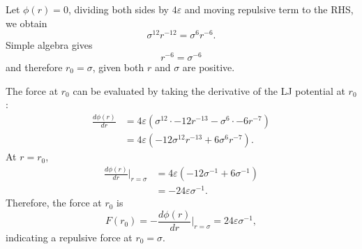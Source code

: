 \documentclass[a4paper,10pt,twocolumn]{article}
\begin{document}
Let $\phi(r)=0$, dividing both sides by $4\varepsilon$ and moving repulsive term to the RHS, we obtain
\[
\sigma^{12}{r}^{-12}=\sigma^{6}{r}^{-6}.
\]
Simple algebra gives
\[
r^{-6}=\sigma^{-6}
\]
and therefore $r_0=\sigma$, given both $r$ and $\sigma$ are positive.

The force at $r_0$ can be evaluated by taking the derivative of the LJ potential at $r_0$:
\begin{align*}
\frac{d\phi(r)}{d r}
&= 4\varepsilon\left(\sigma^{12}\cdot -12r^{-13}-\sigma^{6}\cdot -6r^{-7} \right)
\\
&= 4\varepsilon\left(-12\sigma^{12}r^{-13}+6\sigma^{6}r^{-7} \right).
\end{align*}
At $r=r_0$,
\begin{align*}
\frac{d\phi(r)}{d r}\Big|_{r=\sigma}
&= 4\varepsilon\left(-12\sigma^{-1}+6\sigma^{-1} \right)
\\
&= -24\varepsilon\sigma^{-1}.
\end{align*}
Therefore, the force at $r_0$ is 
\[
F(r_0)=-\frac{d\phi(r)}{d r}\Big|_{r=\sigma}=24\varepsilon\sigma^{-1},
\]
indicating a repulsive force at $r_0=\sigma$.
\end{document}
